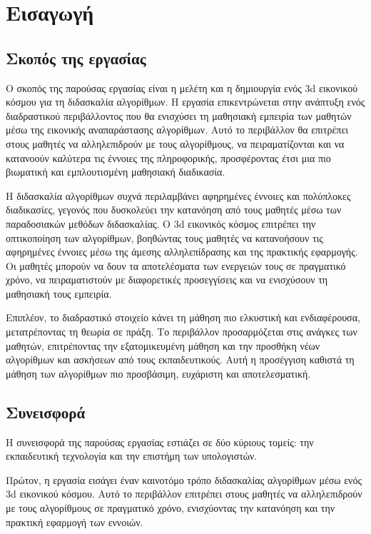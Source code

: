 \hideheader
\section{Εισαγωγή}

\subsection{Σκοπός της εργασίας}

Ο σκοπός της παρούσας εργασίας είναι η μελέτη και η δημιουργία ενός \acrshort{3d} εικονικού κόσμου για τη διδασκαλία αλγορίθμων. Η εργασία επικεντρώνεται στην ανάπτυξη ενός διαδραστικού περιβάλλοντος που θα ενισχύσει τη μαθησιακή εμπειρία των μαθητών μέσω της εικονικής αναπαράστασης αλγορίθμων. Αυτό το περιβάλλον θα επιτρέπει στους μαθητές να αλληλεπιδρούν με τους αλγορίθμους, να πειραματίζονται και να κατανοούν καλύτερα τις έννοιες της πληροφορικής, προσφέροντας έτσι μια πιο βιωματική και εμπλουτισμένη μαθησιακή διαδικασία.

Η διδασκαλία αλγορίθμων συχνά περιλαμβάνει αφηρημένες έννοιες και πολύπλοκες διαδικασίες, γεγονός που δυσκολεύει την κατανόηση από τους μαθητές μέσω των παραδοσιακών μεθόδων διδασκαλίας. Ο \acrshort{3d} εικονικός κόσμος επιτρέπει την οπτικοποίηση των αλγορίθμων, βοηθώντας τους μαθητές να κατανοήσουν τις αφηρημένες έννοιες μέσω της άμεσης αλληλεπίδρασης και της πρακτικής εφαρμογής. Οι μαθητές μπορούν να δουν τα αποτελέσματα των ενεργειών τους σε πραγματικό χρόνο, να πειραματιστούν με διαφορετικές προσεγγίσεις και να ενισχύσουν τη μαθησιακή τους εμπειρία.

Επιπλέον, το διαδραστικό στοιχείο κάνει τη μάθηση πιο ελκυστική και ενδιαφέρουσα, μετατρέποντας τη θεωρία σε πράξη. Το περιβάλλον προσαρμόζεται στις ανάγκες των μαθητών, επιτρέποντας την εξατομικευμένη μάθηση και την προσθήκη νέων αλγορίθμων και ασκήσεων από τους εκπαιδευτικούς. Αυτή η προσέγγιση καθιστά τη μάθηση των αλγορίθμων πιο προσβάσιμη, ευχάριστη και αποτελεσματική.


\subsection{Συνεισφορά}
Η συνεισφορά της παρούσας εργασίας εστιάζει σε δύο κύριους τομείς: την εκπαιδευτική τεχνολογία και την επιστήμη των υπολογιστών.

Πρώτον, η εργασία εισάγει έναν καινοτόμο τρόπο διδασκαλίας αλγορίθμων μέσω ενός \acrshort{3d} εικονικού κόσμου. Αυτό το περιβάλλον επιτρέπει στους μαθητές να αλληλεπιδρούν με τους αλγορίθμους σε πραγματικό χρόνο, ενισχύοντας την κατανόηση και την πρακτική εφαρμογή των εννοιών.

